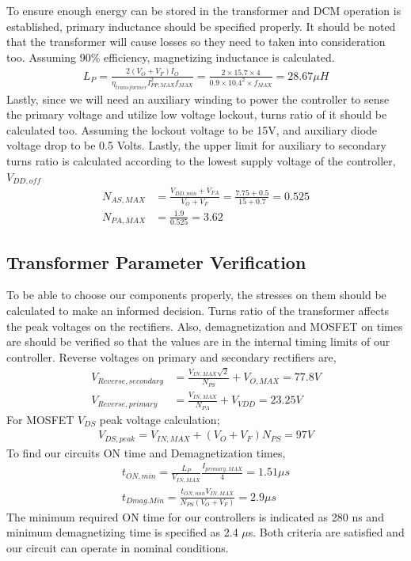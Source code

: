 \par To ensure enough energy can be stored in the transformer and DCM operation is established, primary inductance should be specified properly. It should be noted that the transformer will cause losses so they need to taken into consideration too. Assuming 90\% efficiency, magnetizing inductance is calculated.
\begin{align*}
    L_P=\frac{2(V_O+V_F)I_O}{\eta _{transformer}I_{PP,MAX}^2f_{MAX}}=\frac{2\times 15.7\times 4}{0.9\times 10.4^2\times f_{MAX}}=28.67\mu H
\end{align*}
Lastly, since we will need an auxiliary winding to power the controller to sense the primary voltage and utilize low voltage lockout, turns ratio of it should be calculated too. Assuming the lockout voltage to be 15V, and auxiliary diode voltage drop to be 0.5 Volts. Lastly, the upper limit for auxiliary to secondary turns ratio is calculated according to the lowest supply voltage of the controller, $V_{DD,off}$
\begin{align*}
N_{AS,MAX}&=\frac{V_{DD,min}+V_{FA}}{V_O+V_F}=\frac{7.75+0.5}{15+0.7}=0.525\\
N_{PA,MAX}&=\frac{1.9}{0.525}=3.62
\end{align*}

\subsection{Transformer Parameter Verification}
To be able to choose our components properly, the stresses on them should be calculated to make an informed decision. Turns ratio of the transformer affects the peak voltages on the rectifiers. Also, demagnetization and MOSFET on times are should be verified so that the values are in the internal timing limits of our controller.
Reverse voltages on primary and secondary rectifiers are,
\begin{align*}
V_{Reverse,secondary}&=\frac{V_{IN,MAX}\sqrt{2}}{N_{PS}}+V_{O,MAX}=77.8V\\
V_{Reverse,primary}&=\frac{V_{IN,MAX}}{N_{PA}}+V_{VDD}=23.25V
\end{align*}
For MOSFET $V_{DS}$ peak voltage calculation;
\begin{align*}
    V_{DS,peak}=V_{IN,MAX}+(V_O+V_F)N_{PS}=97V
\end{align*}
To find our circuits ON time and Demagnetization times,
\begin{align*}
t_{ON,min}=\frac{L_P}{V_{IN,MAX}}\frac{I_{primary,MAX}}{4}=1.51\mu s\\
t_{Dmag.Min}=\frac{t_{ON,min}V_{IN,MAX}}{N_{PS}(V_O+V_F)}=2.9\mu s
\end{align*}
The minimum required ON time for our controllers is indicated as 280 ns and minimum demagnetizing time is specified as 2.4 $\mu$s. Both criteria are satisfied and our circuit can operate in nominal conditions.